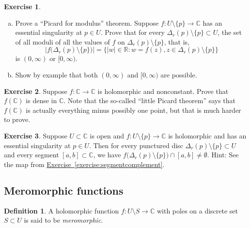 \documentclass[12pt,openany]{book}
\newcommand{\sabs}[1]{\lvert {#1} \rvert}
\newcommand{\abs}[1]{\left\lvert {#1} \right\rvert}
\newcommand{\C}{{\mathbb{C}}}
\newcommand{\R}{{\mathbb{R}}}
\newcommand{\myindex}[1]{#1\index{#1}}
\theoremstyle{plain}
\theoremstyle{remark}
\theoremstyle{definition}
\newtheorem{defn}[thm]{Definition}
\newenvironment{exbox}{%
    \def\FrameCommand{\vrule width 1pt \relax\hspace {10pt}}%
    \MakeFramed {\advance \hsize -\width \FrameRestore }%
}{%
    \endMakeFramed
}
\newenvironment{exparts}{%
    \leavevmode\begin{enumerate}[a),noitemsep,topsep=0pt,parsep=0pt,partopsep=0pt]
}{%
    \end{enumerate}
}
\theoremstyle{exercise}
\newtheorem{exercise}{Exercise}[section]
\theoremstyle{example}
\newcommand{\exerciseref}[1]{\hyperref[#1]{Exercise~\ref*{#1}}}
\begin{document}
\begin{exbox}
\begin{exercise}
\begin{exparts}
\item
Prove a ``Picard for modulus'' theorem.
Suppose $f \colon U \setminus \{ p \} \to \C$ has an essential singularity
at $p \in U$.
Prove that
for every 
$\Delta_r(p) \setminus \{ p \} \subset U$, the set
of all moduli of all the values of $f$ on $\Delta_r(p) \setminus \{ p \}$,
that is,
\begin{equation*}
\abs{f\bigl(\Delta_r(p) \setminus \{ p \} \bigr)}
=
\bigl\{ \sabs{w} \in \R : w = f(z), z \in \Delta_r(p) \setminus \{ p \}
\bigr\}
\end{equation*}
is $(0,\infty)$ or $[0,\infty)$.
\item
Show by example that both $(0,\infty)$ and $[0,\infty)$ are possible.
\end{exparts}
\end{exercise}

\begin{exercise}
Suppose $f \colon \C \to \C$ is holomorphic and nonconstant.  Prove that $f(\C)$ is dense in
$\C$.  Note that the so-called ``little Picard theorem'' says that $f(\C)$
is actually everything minus possibly one point, but that is much harder to
prove.
\end{exercise}

\begin{exercise}
Suppose $U \subset \C$ is open and $f \colon U \setminus \{ p \} \to \C$ is
holomorphic and has
an essential singularity at $p \in U$.  Then for every punctured disc
$\Delta_r(p) \setminus \{ p \} \subset U$ and every segment $[a,b] \subset
\C$, we have
$f\bigl(\Delta_r(p) \setminus \{ p \} \bigr) \cap [a,b] \not= \emptyset$.
Hint: See the map from
\exerciseref{exercise:segmentcomplement}.
\end{exercise}
\end{exbox}


\subsection{Meromorphic functions}
\label{subsec:meromorphic}

\begin{defn}
A holomorphic function $f \colon U \setminus S \to \C$ with poles on a
discrete set $S \subset U$ is said to be \emph{\myindex{meromorphic}}.
\end{defn}
\end{document}
